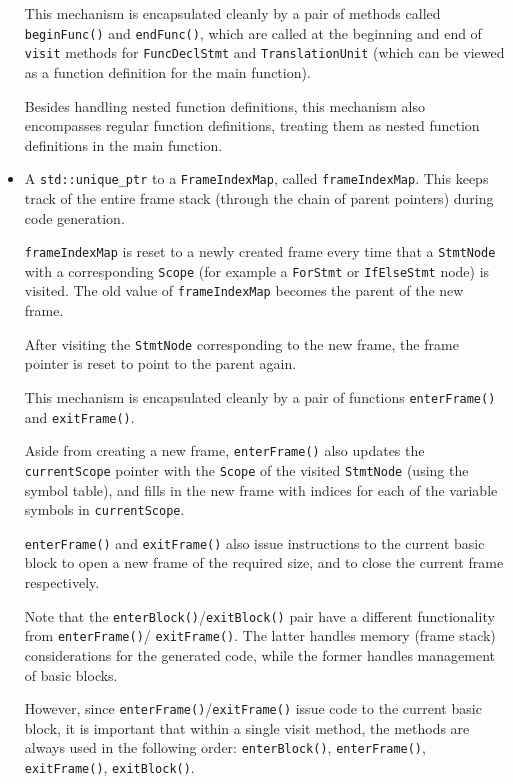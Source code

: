 \documentclass[11pt,a4paper]{scrartcl}
\begin{document}
\begin{itemize}
        This mechanism is encapsulated cleanly by a pair of methods called \verb|beginFunc()| and \verb|endFunc()|, which are called at the beginning and end of \verb|visit| methods for \verb|FuncDeclStmt| and \verb|TranslationUnit| (which can be viewed as a function definition for the main function).

        Besides handling nested function definitions, this mechanism also encompasses regular function definitions, treating them as nested function definitions in the main function.

  \item A \verb|std::unique_ptr| to a \verb|FrameIndexMap|, called \verb|frameIndexMap|. This keeps track of the entire frame stack (through the chain of parent pointers) during code generation.

        \verb|frameIndexMap| is reset to a newly created frame every time that a \verb|StmtNode| with a corresponding \verb|Scope| (for example a \verb|ForStmt| or \verb|IfElseStmt| node) is visited. The old value of \verb|frameIndexMap| becomes the parent of the new frame.

        After visiting the \verb|StmtNode| corresponding to the new frame, the frame pointer is reset to point to the parent again.

        This mechanism is encapsulated cleanly by a pair of functions \verb|enterFrame()| and \verb|exitFrame()|.

        Aside from creating a new frame, \verb|enterFrame()| also updates the \verb|currentScope| pointer with the \verb|Scope| of the visited \verb|StmtNode| (using the symbol table), and fills in the new frame with indices for each of the variable symbols in \verb|currentScope|.

        \verb|enterFrame()| and \verb|exitFrame()| also issue instructions to the current basic block to open a new frame of the required size, and to close the current frame respectively.

        Note that the \verb|enterBlock()|/\verb|exitBlock()| pair have a different functionality from \verb|enterFrame()|/ \verb|exitFrame()|. The latter handles memory (frame stack) considerations for the generated code, while the former handles management of basic blocks.

        However, since \verb|enterFrame()|/\verb|exitFrame()| issue code to the current basic block, it is important that within a single visit method, the methods are always used in the following order: \verb|enterBlock()|, \verb|enterFrame()|, \verb|exitFrame()|, \verb|exitBlock()|.


\end{itemize}
\end{document}
